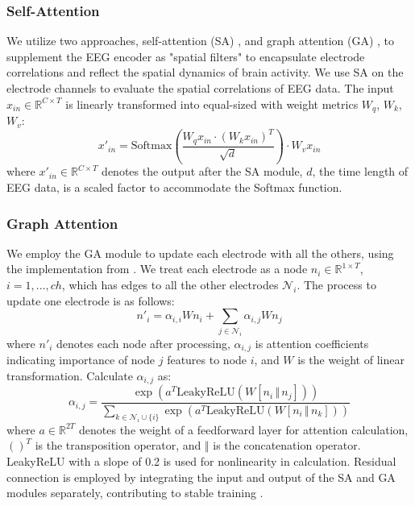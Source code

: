 \subsubsection{Self-Attention}
We utilize two approaches, self-attention (SA) \cite{vaswani2017attentiona}, and graph attention (GA) \cite{velickovic2018graph}, to supplement the EEG encoder as "spatial filters" to encapsulate electrode correlations and reflect the spatial dynamics of brain activity.
We use SA on the electrode channels to evaluate the spatial correlations of EEG data.
The input \(x_{in} \in \mathbb{R}^{C\times T}\) is linearly transformed into equal-sized with weight metrics \(W_q\), \(W_k\), \(W_v\):
\begin{equation}
    x'_{in} = \text{Softmax}(\frac{W_q x_{in} \cdot (W_k x_{in})^T}{\sqrt{d}}) \cdot W_v x_{in}
\end{equation}
where \(x'_{in} \in \mathbb{R}^{C\times T}\) denotes the output after the SA module, \(d\), the time length of EEG data, is a scaled factor to accommodate the Softmax function. 

\subsubsection{Graph Attention}
We employ the GA module to update each electrode with all the others, using the implementation from \cite{brody2022how}.
We treat each electrode as a node \(n_i \in \mathbb{R}^{1\times T}\), \(i=1,...,ch\), which has edges to all the other electrodes \(\mathcal{N}_i\).
The process to update one electrode is as follows:
\begin{equation}
    n'_i = \alpha_{i, i} Wn_i + \sum_{j \in \mathcal{N}_i} \alpha_{i, j} Wn_j
\end{equation}
where \(n'_i\) denotes each node after processing, \(\alpha_{i, j}\) is attention coefficients indicating importance of node \(j\) features to node \(i\), and \(W\) is the weight of linear transformation.
Calculate \(\alpha_{i, j}\) as:
\begin{equation}
    \alpha_{i,j} = \frac{\exp(a^{T}\text{LeakyReLU}(W[n_i \, \Vert \, n_j]))}{\sum_{k \in \mathcal{N}_i \cup \{ i \}}\exp(a^{T}\text{LeakyReLU}(W[n_i \, \Vert \, n_k]))}
\end{equation}
where \(a \in \mathbb{R}^{2T}\) denotes the weight of a feedforward layer for attention calculation, \(()^{T}\) is the transposition operator, and \(\Vert\) is the concatenation operator.
LeakyReLU with a slope of 0.2 is used for nonlinearity in calculation.
Residual connection is employed by integrating the input and output of the SA and GA modules separately, contributing to stable training \citep{he2016deepa}.
